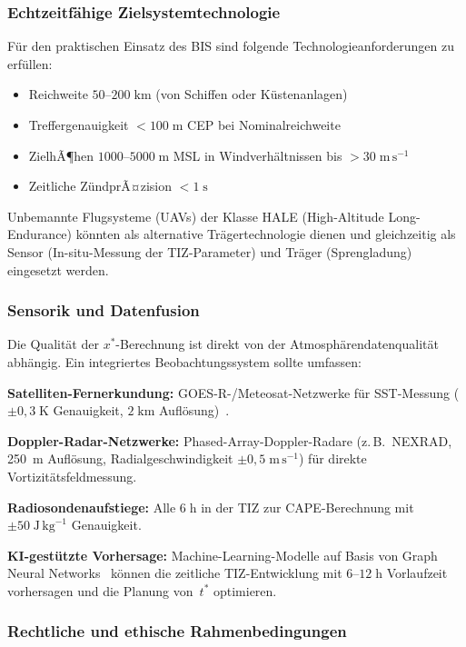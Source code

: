 ﻿\documentclass[a4paper,12pt]{article}
\theoremstyle{definition}
\begin{document}
\subsubsection{Echtzeitf\"{a}hige Zielsystemtechnologie}

F\"{u}r den praktischen Einsatz des BIS sind folgende Technologieanforderungen
zu erf\"{u}llen:
\begin{itemize}
    \item Reichweite $50$--$200\;\mathrm{km}$ (von Schiffen oder K\"{u}stenanlagen)
    \item Treffergenauigkeit $<100\;\mathrm{m}$ CEP bei Nominalreichweite
    \item ZielhÃ¶hen $1000$--$5000\;\mathrm{m}$ MSL
          in Windverh\"{a}ltnissen bis $>30\;\mathrm{m\,s}^{-1}$
    \item Zeitliche Z\"{u}ndprÃ¤zision $<1\;\mathrm{s}$
\end{itemize}
Unbemannte Flugsysteme (UAVs) der Klasse HALE
(High-Altitude Long-Endurance) k\"{o}nnten als alternative Tr\"{a}gertechnologie
dienen und gleichzeitig als Sensor (In-situ-Messung der TIZ-Parameter)
und Tr\"{a}ger (Sprengladung) eingesetzt werden.

\subsubsection{Sensorik und Datenfusion}

Die Qualit\"{a}t der $x^{*}$-Berechnung ist direkt von der
Atmosph\"{a}rendatenqualit\"{a}t abh\"{a}ngig.
Ein integriertes Beobachtungssystem sollte umfassen:

\textbf{Satelliten-Fernerkundung:} GOES-R-/Meteosat-Netzwerke f\"{u}r SST-Messung
($\pm0{,}3\;\mathrm{K}$ Genauigkeit, $2\;\mathrm{km}$ Aufl\"{o}sung)~\cite{velden2005}.

\textbf{Doppler-Radar-Netzwerke:} Phased-Array-Doppler-Radare (z.\,B.\ NEXRAD,
250~m Aufl\"{o}sung, Radialgeschwindigkeit $\pm0{,}5\;\mathrm{m\,s}^{-1}$)
f\"{u}r direkte Vortizit\"{a}tsfeldmessung.

\textbf{Radiosondenaufstiege:} Alle $6\;\mathrm{h}$ in der TIZ
zur CAPE-Berechnung mit $\pm50\;\mathrm{J\,kg}^{-1}$ Genauigkeit.

\textbf{KI-gest\"{u}tzte Vorhersage:} Machine-Learning-Modelle auf Basis von
Graph Neural Networks~\cite{keisler2022} k\"{o}nnen die zeitliche
TIZ-Entwicklung mit $6$--$12\;\mathrm{h}$ Vorlaufzeit vorhersagen
und die Planung von~$t^{*}$ optimieren.

\subsubsection{Rechtliche und ethische Rahmenbedingungen}
\end{document}
